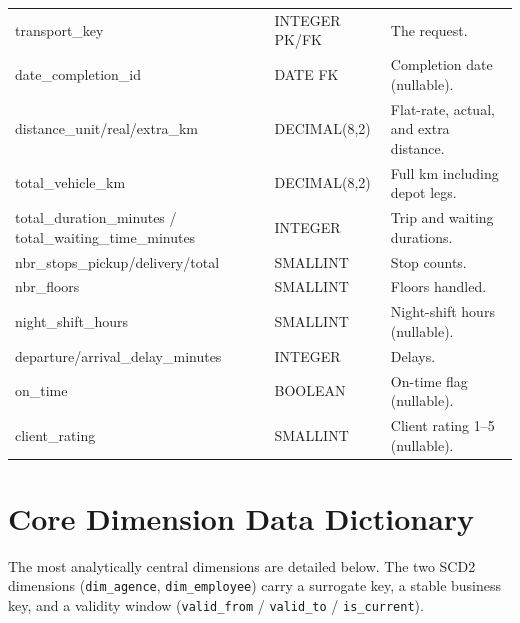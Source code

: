 {\begin{longtable}{|>{\raggedright\arraybackslash}p{4.4cm}|>{\raggedright\arraybackslash}p{2.6cm}|>{\raggedright\arraybackslash}p{6.9cm}|}
transport\_key        & INTEGER PK/FK & The request. \\
date\_completion\_id   & DATE FK & Completion date (nullable). \\
distance\_unit/real/extra\_km & DECIMAL(8,2) & Flat-rate, actual, and extra distance. \\
total\_vehicle\_km     & DECIMAL(8,2) & Full km including depot legs. \\
total\_duration\_minutes / total\_waiting\_time\_minutes & INTEGER & Trip and waiting durations. \\
nbr\_stops\_pickup/delivery/total & SMALLINT & Stop counts. \\
nbr\_floors           & SMALLINT & Floors handled. \\
night\_shift\_hours    & SMALLINT & Night-shift hours (nullable). \\
departure/arrival\_delay\_minutes & INTEGER & Delays. \\
on\_time              & BOOLEAN & On-time flag (nullable). \\
client\_rating        & SMALLINT & Client rating 1--5 (nullable). \\
\hline
\end{longtable}
}

\section{Core Dimension Data Dictionary}
\label{anx:dw-dims}

The most analytically central dimensions are detailed below. The two SCD2 dimensions
(\texttt{dim\_agence}, \texttt{dim\_employee}) carry a surrogate key, a stable business key, and a
validity window (\texttt{valid\_from} / \texttt{valid\_to} / \texttt{is\_current}).

